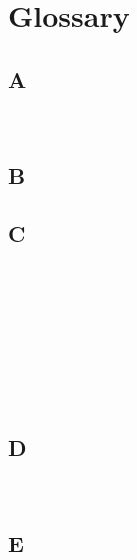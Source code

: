 \setcounter{secnumdepth}{-2}

\chapter{Glossary}

\section*{A}

\noindent\acceptanceCriterionDef\\

\noindent\agileDef

\section*{B}

\noindent\businessCapabilityDef

\section*{C}

\noindent\classDiagramDef\\

\noindent\clientDef\\

\noindent\clientServerArchitectureDef\\

\noindent\codeDecayDef\\

\noindent\codeSmellDef\\

\noindent\componentDef\\

\noindent\contingencyDef\\

\noindent\couplingDef

\section*{D}

\noindent\dodDef\\

\section*{E}

\noindent\eisenhowerMatrixDef\\


